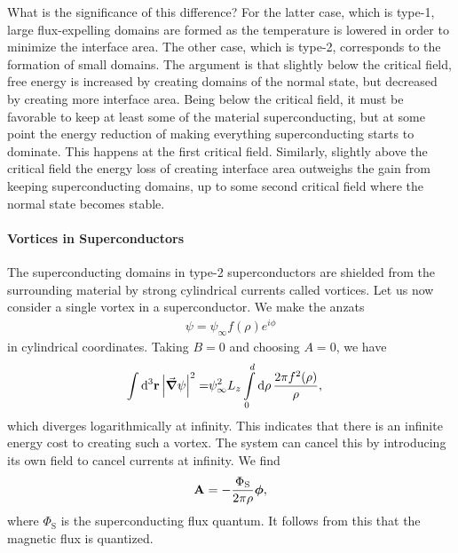 What is the significance of this difference? For the latter case, which is type-1, large flux-expelling domains are formed as the temperature is lowered in order to minimize the interface area. The other case, which is type-2, corresponds to the formation of small domains. The argument is that slightly below the critical field, free energy is increased by creating domains of the normal state, but decreased by creating more interface area. Being below the critical field, it must be favorable to keep at least some of the material superconducting, but at some point the energy reduction of making everything superconducting starts to dominate. This happens at the first critical field. Similarly, slightly above the critical field the energy loss of creating interface area outweighs the gain from keeping superconducting domains, up to some second critical field where the normal state becomes stable.

\paragraph{Vortices in Superconductors}
The superconducting domains in type-2 superconductors are shielded from the surrounding material by strong cylindrical currents called vortices. Let us now consider a single vortex in a superconductor. We make the anzats
\begin{align*}
	\psi = \psi_{\infty}f(\rho)e^{i\phi}
\end{align*}
in cylindrical coordinates. Taking $B = 0$ and choosing $A = 0$, we have
\begin{align*}
	\int\limits_{}^{}\dd[3]{\vb{r}}\abs{\grad{\psi}}^{2} =& \psi_{\infty}^{2}L_{z}\int\limits_{0}^{d}\dd{\rho}\frac{2\pi f^{2}(\rho)}{\rho},
\end{align*}
which diverges logarithmically at infinity. This indicates that there is an infinite energy cost to creating such a vortex. The system can cancel this by introducing its own field to cancel currents at infinity. We find
\begin{align*}
	\vb{A} = -\frac{\Phi_{\text{S}}}{2\pi\rho}\vb*{\phi},
\end{align*}
where $\Phi_{\text{S}}$ is the superconducting flux quantum. It follows from this that the magnetic flux is quantized.

